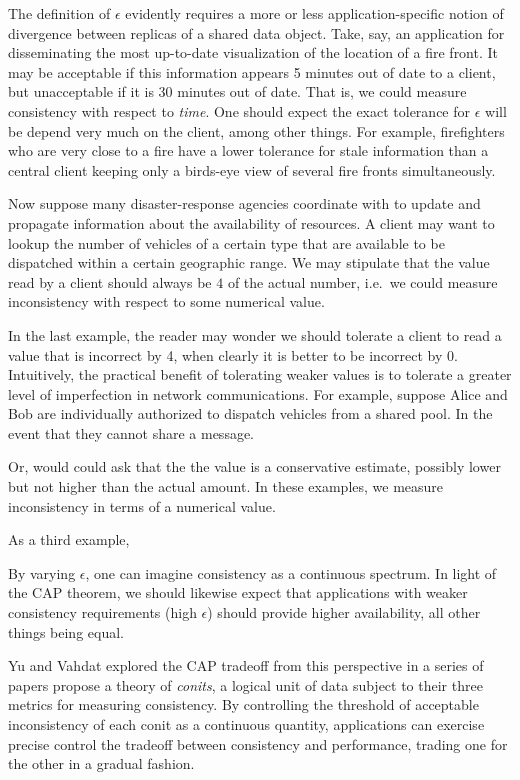 \documentclass[]             %
{NASA}                       %
\theoremstyle{definition}
\begin{document}
The definition of \(\epsilon\) evidently requires a more or less
application-specific notion of divergence between replicas of a shared
data object. Take, say, an application for disseminating the most
up-to-date visualization of the location of a fire front. It may be
acceptable if this information appears 5 minutes out of date to a
client, but unacceptable if it is 30 minutes out of date. That is, we
could measure consistency with respect to \emph{time}. One should expect
the exact tolerance for \(\epsilon\) will be depend very much on the
client, among other things. For example, firefighters who are very close
to a fire have a lower tolerance for stale information than a central
client keeping only a birds-eye view of several fire fronts
simultaneously.

Now suppose many disaster-response agencies coordinate with to update
and propagate information about the availability of resources. A client
may want to lookup the number of vehicles of a certain type that are
available to be dispatched within a certain geographic range. We may
stipulate that the value read by a client should always be \(4\) of the
actual number, i.e.~we could measure inconsistency with respect to some
numerical value.

In the last example, the reader may wonder we should tolerate a client
to read a value that is incorrect by 4, when clearly it is better to be
incorrect by 0. Intuitively, the practical benefit of tolerating weaker
values is to tolerate a greater level of imperfection in network
communications. For example, suppose Alice and Bob are individually
authorized to dispatch vehicles from a shared pool. In the event that
they cannot share a message.

Or, would could ask that the the value is a conservative estimate,
possibly lower but not higher than the actual amount. In these examples,
we measure inconsistency in terms of a numerical value.

As a third example,

By varying \(\epsilon\), one can imagine consistency as a continuous
spectrum. In light of the CAP theorem, we should likewise expect that
applications with weaker consistency requirements (high \(\epsilon\))
should provide higher availability, all other things being equal.

Yu and Vahdat explored the CAP tradeoff from this perspective in a
series of papers \cite{2000tact,2000tactalgorithms,10.5555/1251229.1251250,DBLP:conf/icdcs/YuV01,2002tact}
propose a theory of \emph{conits}, a logical unit of data subject to
their three metrics for measuring consistency. By controlling the
threshold of acceptable inconsistency of each conit as a continuous
quantity, applications can exercise precise control the tradeoff between
consistency and performance, trading one for the other in a gradual
fashion.
\end{document}
